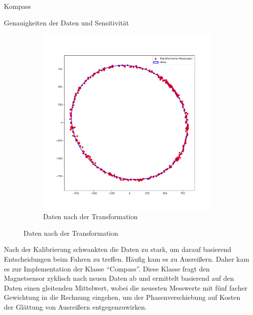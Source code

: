 \documentclass[12pt]{report}
\begin{document}
\begin{section}{Kompass}
\begin{subsection}{Genauigkeiten der Daten und Sensitivität}
\begin{figure}[h!]
\begin{subfigure}{0.45\linewidth}
      \includegraphics[width=\linewidth]{lernportfolio_assets/MagnetDatenAlsKreis.png}
      \caption{Daten nach der Transformation}
    \end{subfigure}
  \end{figure}
  
  Nach der Kalibrierung schwankten die Daten zu stark, um darauf basierend
  Entscheidungen beim Fahren zu treffen. Häufig kam es zu Ausreißern. Daher kam
  es zur Implementation der Klasse "`Compass"'. Diese Klasse fragt den
  Magnetsensor zyklisch nach neuen Daten ab und ermittelt basierend auf den
  Daten einen gleitenden Mittelwert, wobei die neuesten Messwerte mit fünf facher
  Gewichtung in die Rechnung eingehen, um der Phasenverschiebung auf Kosten der
  Glättung von Ausreißern entgegenzuwirken.


\end{subsection}
\end{section}
\end{document}
